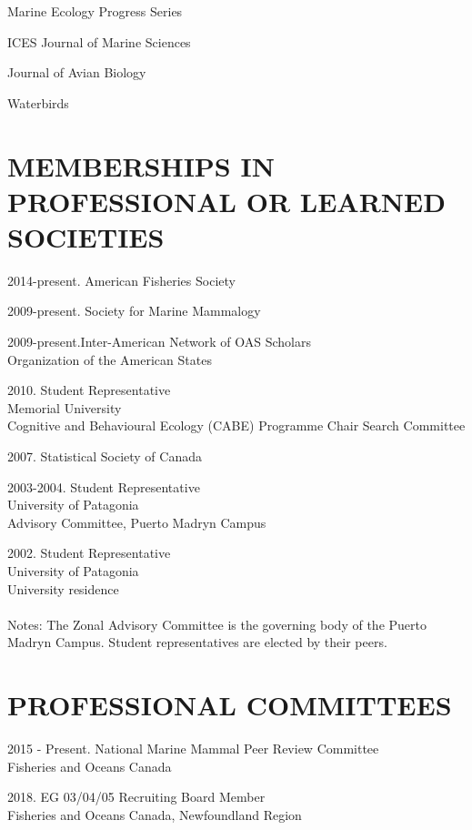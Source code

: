 \documentclass{res}
\begin{document}
\begin{resume}
Marine Ecology Progress Series

ICES Journal of Marine Sciences

Journal of Avian Biology

Waterbirds

\section{MEMBERSHIPS IN PROFESSIONAL OR LEARNED SOCIETIES}
\vspace{0.2in}
\begin{hangparas}{.4in}{1}
2014-present. American Fisheries Society

2009-present. Society for Marine Mammalogy    

2009-present.Inter-American Network of OAS Scholars     \\
Organization of the American States

2010. Student Representative\\
Memorial University\\
Cognitive and Behavioural Ecology (CABE) Programme Chair Search Committee

2007. Statistical Society of Canada

2003-2004. Student Representative\\
University of Patagonia\\
Advisory Committee, Puerto Madryn Campus

2002. Student Representative\\
University of Patagonia\\
University residence\\~\\
Notes: The Zonal Advisory Committee is the governing body of the Puerto Madryn Campus. 
Student representatives are elected by their peers.

\end{hangparas}
\section{PROFESSIONAL COMMITTEES}
\vspace{0.2in}
\begin{hangparas}{.4in}{1}
2015 - Present. National Marine Mammal Peer Review Committee\\
Fisheries and Oceans Canada

2018. EG 03/04/05 Recruiting Board Member\\
Fisheries and Oceans Canada, Newfoundland Region


\end{hangparas}
\end{resume}
\end{document}
